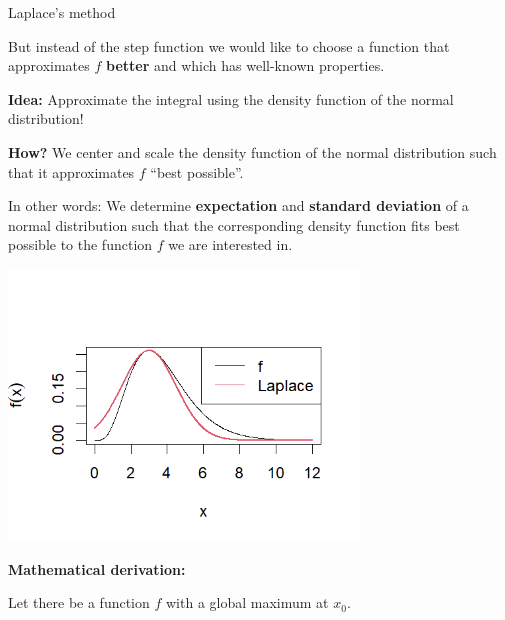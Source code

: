 \begin{vbframe}{Laplace's method}
\begin{footnotesize}

\end{footnotesize}

\framebreak

But instead of the step function we would like to choose a function that approximates $f$ \textbf{better} and which has well-known properties.

\lz

\textbf{Idea:} Approximate the integral using the density function of the normal distribution!

\lz

\textbf{How?} We center and scale the density function of the normal distribution such that it approximates $f$ \enquote{best possible}.

\framebreak

In other words: We determine \textbf{expectation} and \textbf{standard deviation} of a normal distribution such that the corresponding density function fits best possible to the function $f$ we are interested in.

\begin{center}
\includegraphics[width =0.7\textwidth]{figure_man/laplace01.png}
\end{center}


\framebreak

\textbf{Mathematical derivation:}

Let there be a function $f$ with a global maximum at $x_0$.


\end{vbframe}
